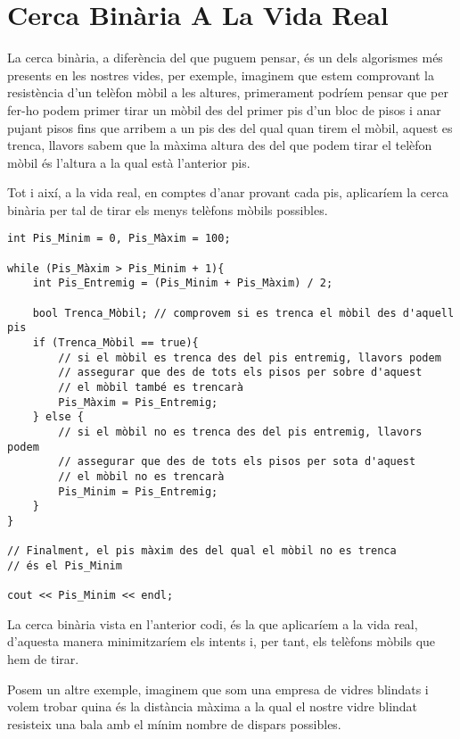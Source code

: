 \section{Cerca Binària A La Vida Real}

La cerca binària, a diferència del que puguem pensar, és un dels algorismes més presents en les nostres vides, per exemple, imaginem que estem comprovant la resistència d'un telèfon mòbil a les altures, primerament podríem pensar que per fer-ho podem primer tirar un mòbil des del primer pis d'un bloc de pisos i anar pujant pisos fins que arribem a un pis des del qual quan tirem el mòbil, aquest es trenca, llavors sabem que la màxima altura des del que podem tirar el telèfon mòbil és l'altura a la qual està l'anterior pis.

Tot i així, a la vida real, en comptes d'anar provant cada pis, aplicaríem la cerca binària per tal de tirar els menys telèfons mòbils possibles. \newline

\begin{lstlisting}
int Pis_Minim = 0, Pis_Màxim = 100;

while (Pis_Màxim > Pis_Minim + 1){
    int Pis_Entremig = (Pis_Minim + Pis_Màxim) / 2;

    bool Trenca_Mòbil; // comprovem si es trenca el mòbil des d'aquell pis
    if (Trenca_Mòbil == true){
        // si el mòbil es trenca des del pis entremig, llavors podem
        // assegurar que des de tots els pisos per sobre d'aquest
        // el mòbil també es trencarà
        Pis_Màxim = Pis_Entremig;
    } else {
        // si el mòbil no es trenca des del pis entremig, llavors podem
        // assegurar que des de tots els pisos per sota d'aquest
        // el mòbil no es trencarà
        Pis_Minim = Pis_Entremig;
    }
}

// Finalment, el pis màxim des del qual el mòbil no es trenca
// és el Pis_Minim

cout << Pis_Minim << endl;
\end{lstlisting}

La cerca binària vista en l'anterior codi, és la que aplicaríem a la vida real, d'aquesta manera minimitzaríem els intents i, per tant, els telèfons mòbils que hem de tirar. \newline

Posem un altre exemple, imaginem que som una empresa de vidres blindats i volem trobar quina és la distància màxima a la qual el nostre vidre blindat resisteix una bala amb el mínim nombre de dispars possibles.

